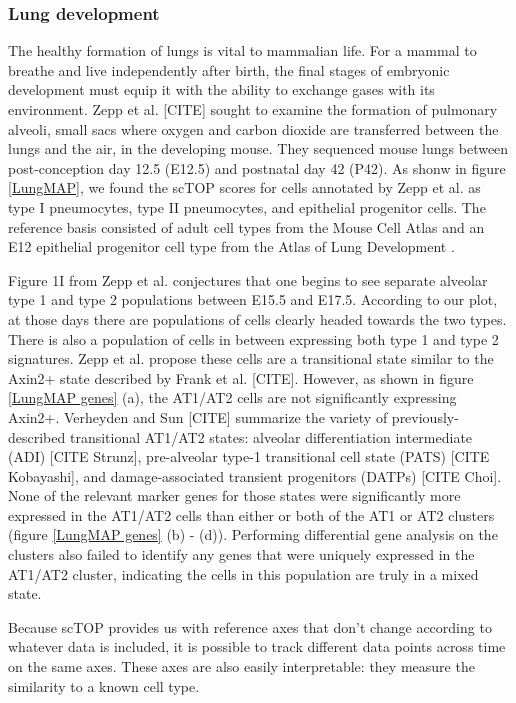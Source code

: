 \documentclass[aps,superscriptaddress, notitlepage,longbibliography]{revtex4-1}
\begin{document}
\subsubsection{Lung development}
The healthy formation of lungs is vital to mammalian life. For a mammal to breathe and live independently after birth, the final stages of embryonic development must equip it with the ability to exchange gases with its environment. Zepp et al. [CITE] sought to examine the formation of pulmonary alveoli, small sacs where oxygen and carbon dioxide are transferred between the lungs and the air, in the developing mouse. They sequenced mouse lungs between post-conception day 12.5 (E12.5) and postnatal day 42 (P42). As shonw in figure \ref{LungMAP}, we found the scTOP scores for cells annotated by Zepp et al. as type I pneumocytes, type II pneumocytes, and epithelial progenitor cells. The reference basis consisted of adult cell types from the Mouse Cell Atlas and an E12 epithelial progenitor cell type from the Atlas of Lung Development \cite{negretti_single-cell_2021}.

Figure 1I from Zepp et al. conjectures that one begins to see separate alveolar type 1 and type 2 populations between E15.5 and E17.5. According to our plot, at those days there are populations of cells clearly headed towards the two types. There is also a population of cells in between expressing both type 1 and type 2 signatures. Zepp et al. propose these cells are a transitional state similar to the Axin2+ state described by Frank et al. [CITE]. However, as shown in figure \ref{LungMAP genes} (a), the AT1/AT2 cells are not significantly expressing Axin2+. Verheyden and Sun [CITE] summarize the variety of previously-described transitional AT1/AT2 states: alveolar differentiation intermediate (ADI) [CITE Strunz], pre-alveolar type-1 transitional cell state (PATS) [CITE Kobayashi], and damage-associated transient progenitors (DATPs) [CITE Choi]. None of the relevant marker genes for those states were significantly more expressed in the AT1/AT2 cells than either or both of the AT1 or AT2 clusters (figure \ref{LungMAP genes} (b) - (d)). Performing differential gene analysis on the clusters also failed to identify any genes that were uniquely expressed in the AT1/AT2 cluster, indicating the cells in this population are truly in a mixed state.

Because scTOP provides us with reference axes that don't change according to whatever data is included, it is possible to track different data points across time on the same axes. These axes are also easily interpretable: they measure the similarity to a known cell type.
\end{document}
